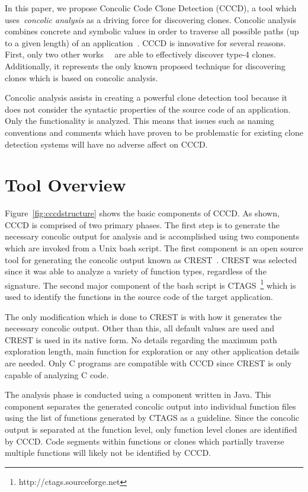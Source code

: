 \documentclass[conference]{IEEEtran}
\begin{document}
In this paper, we propose Concolic Code Clone Detection (CCCD), a tool which uses~\emph{concolic analysis} as a driving force for discovering clones. Concolic analysis combines concrete and symbolic values in order to traverse all possible paths (up to a given length) of an application~\cite{Kim:2012:IAC:2337223.2337373}. CCCD is innovative for several reasons. First, only two other works~\cite{Kim:2011:MMC:1985793.1985835}~\cite{Kraw2012} are able to effectively discover type-4 clones. Additionally, it represents the only known proposed technique for discovering clones which is based on concolic analysis.

Concolic analysis assists in creating a powerful clone detection tool because it does not consider the syntactic properties of the source code of an application. Only the functionality is analyzed. This means that issues such as naming conventions and comments which have proven to be problematic for existing clone detection systems will have no adverse affect on CCCD.

\section{Tool Overview}
\label{sec: tooloverview}

Figure~\ref{fig:cccdstructure} shows the basic components of CCCD. As shown, CCCD is comprised of two primary phases. The first step is to generate the necessary concolic output for analysis and is accomplished using two components which are invoked from a Unix bash script. The first component is an open source tool for generating the concolic output known as CREST~\cite{Burnim:2008:HSD:1642931.1642995}. CREST was selected since it was able  to analyze a variety of function types, regardless of the signature. The second major component of the bash script is CTAGS~\footnote{http://ctags.sourceforge.net} which is used to identify the functions in the source code of the target application. 

The only modification which is done to CREST is with how it generates the necessary concolic output. Other than this, all default values are used and CREST is used in its native form. No details regarding the maximum path exploration length, main function for exploration or any other application details are needed. Only C programs are compatible with CCCD since CREST is only capable of analyzing C code.

The analysis phase is conducted using a component written in Java. This component separates the generated concolic output into individual function files using the list of functions generated by CTAGS as a guideline. Since the concolic output is separated at the function level, only function level clones are identified by CCCD. Code segments within functions or clones which partially traverse multiple functions will likely not be identified by CCCD.
\end{document}
